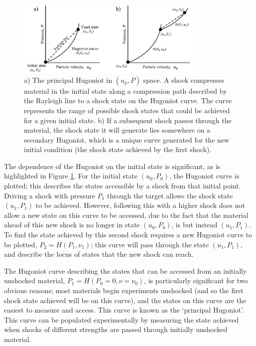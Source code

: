 \begin{figure}
\centering
\includegraphics[width=0.8\textwidth]{figures/Theory/SecondaryHugoniot.pdf}%
\caption{\label{fig:SecondaryHugoniot} a) The principal Hugoniot in $(u_p, P)$ space. A shock compresses material in the initial state along a compression path described by the Rayleigh line to a shock state on the Hugoniot curve. The curve represents the range of possible shock states that could be achieved for a given initial state. b) If a subsequent shock passes through the material, the shock state it will generate lies somewhere on a secondary Hugoniot, which is a unique curve generated for the new initial condition (the shock state achieved by the first shock).}
\end{figure}

The dependence of the Hugoniot on the initial state is significant, as is highlighted in Figure \ref{fig:SecondaryHugoniot}. For the initial state $(u_0, P_0)$, the Hugoniot curve is plotted; this describes the states accessible by a shock from that initial point. Driving a shock with pressure $P_1$ through the target allows the shock state $(u_1, P_1)$ to be achieved. However, following this with a higher shock does not allow a new state on this curve to be accessed, due to the fact that the material ahead of this new shock is no longer in state $(u_0, P_0)$, is but instead $(u_1, P_1)$. To find the state achieved by this second shock requires a new Hugoniot curve to be plotted, $P_2 = H(P_1, \nu_1)$; this curve will pass through the state $(u_1, P_1)$, and describe the locus of states that the new shock can reach.

The Hugoniot curve describing the states that can be accessed from an initially unshocked material, $P_1 = H(P_0 = 0, \nu=\nu_0)$, is particularly significant for two obvious reasons; most materials begin experiments unshocked (and so the first shock state achieved will be on this curve), and the states on this curve are the easiest to measure and access. This curve is known as the `principal Hugoniot'. This curve can be populated experimentally by measuring the state achieved when shocks of different strengths are passed through initially unshocked material.

